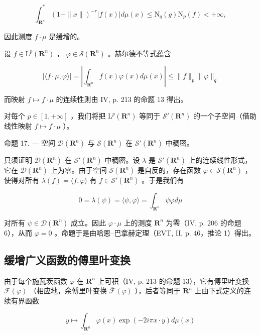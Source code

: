 \[
\int_ {\mathbf {R} ^ {n}} ^ {*} (1 + \| x \|) ^ {- r} | f (x) | d \mu (x) \leqslant \mathrm{N} _ {q} (g) \mathrm{N} _ {p} (f) <   + \infty ,
\]

因此测度 \(f \cdot \mu\) 是缓增的。

设 \(f \in \mathrm{L}^p(\mathbf{R}^n)\) ， \(\varphi \in \mathcal{S}(\mathbf{R}^n)\) 。赫尔德不等式蕴含

\[
| \langle f \cdot \mu , \varphi \rangle | = \left| \int_ {\mathbf {R} ^ {n}} f (x) \varphi (x) d \mu (x) \right| \leqslant \| f \| _ {p} \| \varphi \| _ {q}
\]

而映射 \(f \mapsto f \cdot \mu\) 的连续性则由 IV, p. 213 的命题 13 得出。

对每个 \(p \in [1, +\infty]\) ，我们将把 \(\mathrm{L}^p(\mathbf{R}^n)\) 等同于 \(\mathcal{S}'(\mathbf{R}^n)\) 的一个子空间（借助线性映射 \(f \mapsto f \cdot \mu\) ）。

命题 17. --- 空间 \(\mathcal{D}(\mathbf{R}^{n})\) 与 \(\mathcal{S}(\mathbf{R}^{n})\) 在 \(\mathcal{S}'(\mathbf{R}^{n})\) 中稠密。

只须证明 \(\mathcal{D}(\mathbf{R}^{n})\) 在 \(\mathcal{S}'(\mathbf{R}^{n})\) 中稠密。设 \(\lambda\) 是 \(\mathcal{S}'(\mathbf{R}^{n})\) 上的连续线性形式，它在 \(\mathcal{D}(\mathbf{R}^{n})\) 上为零。由于空间 \(\mathcal{S}(\mathbf{R}^{n})\) 是自反的，存在函数 \(\varphi \in \mathcal{S}(\mathbf{R}^{n})\) ，使得对所有 \(\lambda(f) = \langle f, \varphi \rangle\) 有 \(f \in \mathcal{S}'(\mathbf{R}^{n})\) 。于是我们有

\[
0 = \lambda (\psi) = \langle \psi , \varphi \rangle = \int_ {\mathbf {R} ^ {n}} \psi \varphi d \mu
\]

对所有 \(\psi\in\mathcal{D}(\mathbf{R}^{n})\) 成立。因此 \(\varphi\cdot\mu\) 上的测度 \(\mathbf{R}^{n}\) 为零（IV, p. 206 的命题 6），从而 \(\varphi=0\) 。命题于是由哈恩–巴拿赫定理（EVT, II, p. 46，推论 1）得出。

\subsection{缓增广义函数的傅里叶变换}

由于每个施瓦茨函数 \(\varphi\) 在 \(\mathbf{R}^n\) 上可积（IV, p. 213 的命题 13），它有傅里叶变换 \(\mathcal{F}(\varphi)\) （相应地，余傅里叶变换 \(\overline{\mathcal{F}}(\varphi)\) ），后者等同于 \(\mathbf{R}^n\) 上由下式定义的连续有界函数

\[
y \mapsto \int_ {\mathbf {R} ^ {n}} \varphi (x) \exp (- 2 i \pi x \cdot y) d \mu (x)
\]

